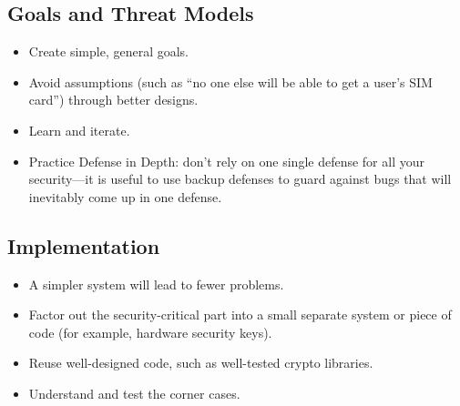 \subsection{Goals and Threat Models}
\begin{itemize}
	\item Create simple, general goals.
	\item Avoid assumptions (such as ``no one else will be able to get a user's SIM card'') through better designs.
	\item Learn and iterate.
	\item Practice Defense in Depth: don't rely on one single defense for all your security---it is useful to use backup defenses to guard against bugs that will inevitably come up in one defense.
\end{itemize}

\subsection{Implementation}
\begin{itemize}
	\item A simpler system will lead to fewer problems.
	\item Factor out the security-critical part into a small separate system or piece of code (for example, hardware security keys).
	\item Reuse well-designed code, such as well-tested crypto libraries.
	\item Understand and test the corner cases.
\end{itemize}



